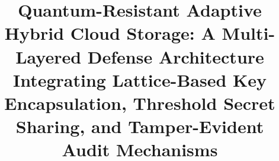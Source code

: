 \documentclass[pdflatex,sn-mathphys,Numbered]{sn-jnl}%
\theoremstyle{thmstyleone}%
\theoremstyle{thmstyletwo}%
\theoremstyle{thmstylethree}%
\begin{document}
\title[Quantum-Resistant Adaptive Hybrid Cloud Storage]{Quantum-Resistant Adaptive Hybrid Cloud Storage: A Multi-Layered Defense Architecture Integrating Lattice-Based Key Encapsulation, Threshold Secret Sharing, and Tamper-Evident Audit Mechanisms}

\author*[1]{ }
\author[1]{ }

\end{document}
